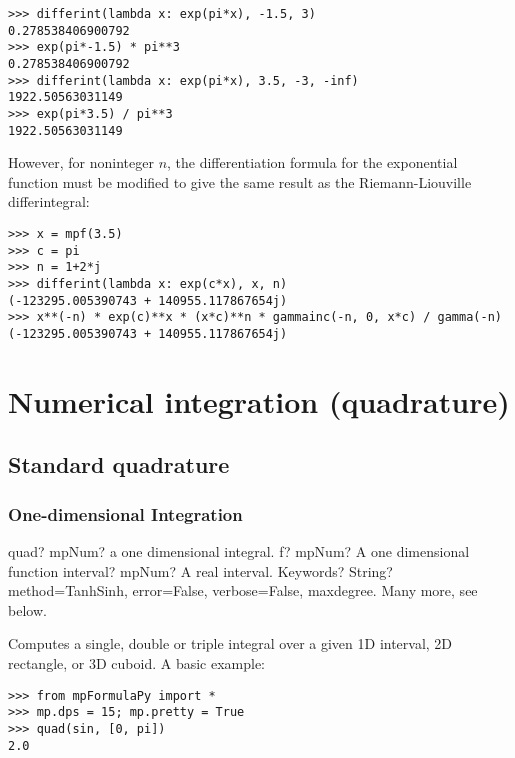 \begin{lstlisting}
>>> differint(lambda x: exp(pi*x), -1.5, 3)
0.278538406900792
>>> exp(pi*-1.5) * pi**3
0.278538406900792
>>> differint(lambda x: exp(pi*x), 3.5, -3, -inf)
1922.50563031149
>>> exp(pi*3.5) / pi**3
1922.50563031149
\end{lstlisting}

However, for noninteger $n$, the differentiation formula for the exponential function must be modified to give the same result as the Riemann-Liouville differintegral:

\begin{lstlisting}
>>> x = mpf(3.5)
>>> c = pi
>>> n = 1+2*j
>>> differint(lambda x: exp(c*x), x, n)
(-123295.005390743 + 140955.117867654j)
>>> x**(-n) * exp(c)**x * (x*c)**n * gammainc(-n, 0, x*c) / gamma(-n)
(-123295.005390743 + 140955.117867654j)
\end{lstlisting}








\newpage

\chapter{Numerical integration (quadrature)}
\section{Standard quadrature}



\subsection{One-dimensional Integration}

\begin{mpFunctionsExtract}
	\mpFunctionThree
	{quad? mpNum? a one dimensional integral.}
	{f? mpNum? A one dimensional function}
	{interval? mpNum? A real interval.}	
	{Keywords? String? method=TanhSinh, error=False, verbose=False, maxdegree. Many more, see below.}	
\end{mpFunctionsExtract}

\vpara
Computes a single, double or triple integral over a given 1D interval, 2D rectangle, or 3D cuboid. A basic example:

\begin{lstlisting}
>>> from mpFormulaPy import *
>>> mp.dps = 15; mp.pretty = True
>>> quad(sin, [0, pi])
2.0
\end{lstlisting}

